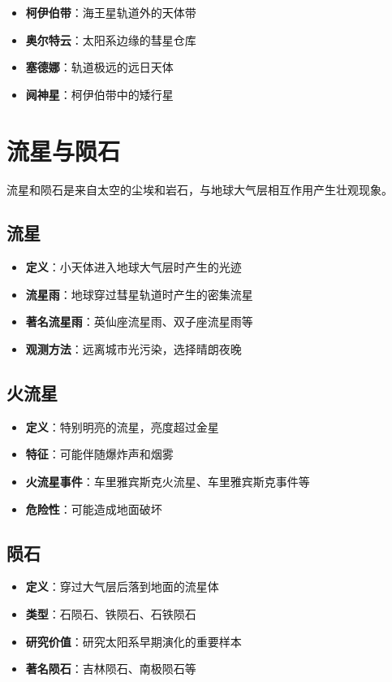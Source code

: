 \documentclass[12pt,UTF8]{ctexbook}
\begin{document}
\begin{itemize}
  \item \textbf{柯伊伯带}：海王星轨道外的天体带
  \item \textbf{奥尔特云}：太阳系边缘的彗星仓库
  \item \textbf{塞德娜}：轨道极远的远日天体
  \item \textbf{阋神星}：柯伊伯带中的矮行星
\end{itemize}

\section{流星与陨石}

流星和陨石是来自太空的尘埃和岩石，与地球大气层相互作用产生壮观现象。

\subsection{流星}

\begin{itemize}
  \item \textbf{定义}：小天体进入地球大气层时产生的光迹
  \item \textbf{流星雨}：地球穿过彗星轨道时产生的密集流星
  \item \textbf{著名流星雨}：英仙座流星雨、双子座流星雨等
  \item \textbf{观测方法}：远离城市光污染，选择晴朗夜晚
\end{itemize}

\subsection{火流星}

\begin{itemize}
  \item \textbf{定义}：特别明亮的流星，亮度超过金星
  \item \textbf{特征}：可能伴随爆炸声和烟雾
  \item \textbf{火流星事件}：车里雅宾斯克火流星、车里雅宾斯克事件等
  \item \textbf{危险性}：可能造成地面破坏
\end{itemize}

\subsection{陨石}

\begin{itemize}
  \item \textbf{定义}：穿过大气层后落到地面的流星体
  \item \textbf{类型}：石陨石、铁陨石、石铁陨石
  \item \textbf{研究价值}：研究太阳系早期演化的重要样本
  \item \textbf{著名陨石}：吉林陨石、南极陨石等
\end{itemize}
\end{document}
